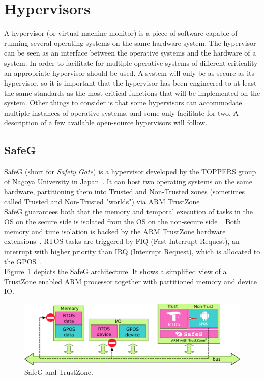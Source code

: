 \section{Hypervisors}
A hypervisor (or virtual machine monitor) is a piece of software capable of running several operating systems on the same hardware system. The hypervisor can be seen as an interface between the operative systems and the hardware of a system. In order to facilitate for multiple operative systems of different criticality an appropriate hypervisor should be used. A system will only be as secure as its hypervisor, so it is important that the hypervisor has been engineered to at least the same standards as the most critical functions that will be implemented on the system. Other things to consider is that some hypervisors can accommodate multiple instances of operative systems, and some only facilitate for two. A description of a few available open-source hypervisors will follow.

\subsection{SafeG}
\label{sec:safeg}
SafeG (short for \textit{Safety Gate}) is a hypervisor developed by the TOPPERS group of Nagoya University in Japan~\cite{website:safeg}. It can host two operating systems on the same hardware, partitioning them into Trusted and Non-Trusted zones (sometimes called Trusted and Non-Trusted "worlds") via ARM TrustZone~\cite{website:ARM}.\\ %

SafeG guarantees both that the memory and temporal execution of tasks in the OS on the secure side is isolated from the OS on the non-secure side~\cite{sangorrinlopez2012}. Both memory and time isolation is backed by the ARM TrustZone hardware extensions~\cite{sangorrinlopez2012}. RTOS tasks are triggered by FIQ (Fast Interrupt Request), an interrupt with higher priority than IRQ (Interrupt Request), which is allocated to the GPOS~\cite{sangorrinlopez2012}.\\

Figure~\ref{fig:safeg} depicts the SafeG architecture. It shows a simplified view of a TrustZone enabled ARM processor together with partitioned memory and device IO.

\begin{figure}[H]
\centering
\includegraphics[width=\textwidth]{./img/literature_safeg.png}
\caption{SafeG and TrustZone.}\label{fig:safeg}
\end{figure}


